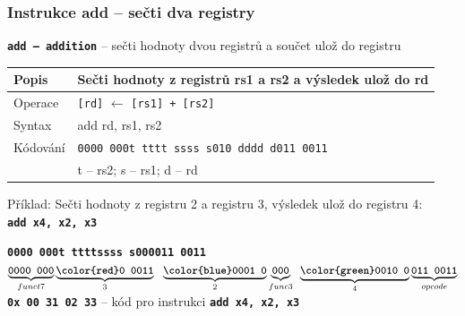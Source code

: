 \documentclass{beamer}
\begin{document}
\begin{frame}
\frametitle{Instrukce add -- sečti dva registry}

\textbf{\texttt{add -- addition}} -- sečti hodnoty dvou registrů a součet ulož do registru

\bigskip

\begin{tabular}{|l|l|}\hline
Popis & Sečti hodnoty z registrů rs1 a rs2 a výsledek ulož do rd \\ \hline
Operace & \texttt{[rd]} $\leftarrow$ \texttt{[rs1] + [rs2]} \\ \hline
Syntax & add rd, rs1, rs2 \\ \hline
Kódování & \texttt{0000 000t tttt ssss s010 dddd d011 0011} \\ 
 & t -- rs2; s -- rs1; d -- rd \\ \hline
\end{tabular}

\bigskip

Příklad: Sečti hodnoty z registru 2 a registru 3, výsledek ulož do registru 4:\\
\textbf{\texttt{add x4, x2, x3}}

\textbf{\texttt{0000 000\hspace{0.08cm}\color{red}t tttt}}\phantom{x}\hspace{0.13cm}\textbf{\texttt{\color{blue}ssss s}}\hspace{0.1cm}\textbf{\texttt{000\hspace{0.05cm}011 0011}}\\
$\underbrace{\textbf{\texttt{0000 000}}}_{funct7}
\underbrace{\textbf{\texttt{\color{red}0 0011}}}_{3}
\texttt{ }\underbrace{\textbf{\texttt{\color{blue}0001 0}}}_{2}
\underbrace{\textbf{\texttt{000}}}_{func3}\phantom{i}
\underbrace{\textbf{\texttt{\color{green}0010 0}}}_{4}
\underbrace{\textbf{\texttt{011 0011}}}_{opcode}$\\

\textbf{\texttt{0x 00 31 02 33}} -- kód pro instrukci \textbf{\texttt{add x4, x2, x3}}


\end{frame}
\end{document}
